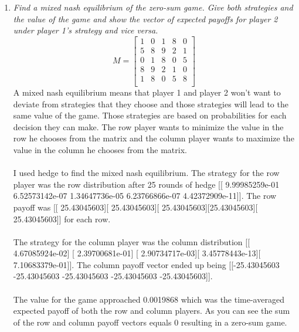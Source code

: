 \documentclass[12pt]{article}
\begin{document}
\begin{enumerate}
  \newpage
  \item \textit{Find a mixed nash equilibrium of the zero-sum game.  Give both
  strategies and the value of the game and show the vector of expected payoffs
  for player 2 under player 1's strategy and vice versa.}
    $$
    M = \begin{bmatrix}
        1 & 0 & 1 & 8 & 0\\
        5 & 8 & 9 & 2 & 1\\
        0 & 1 & 8 & 0 & 5\\
        8 & 9 & 2 & 1 & 0\\
        1 & 8 & 0 & 5 & 8\\
        \end{bmatrix}
    $$
  A mixed nash equilibrium means that player 1 and player 2 won't want to
  deviate from strategies that they choose and those strategies will lead to the same
  value of the game.  Those strategies are based on probabilities for each
  decision they can make. The row player wants to minimize the value in the
  row he chooses from the matrix and the column player wants to
  maximize the value in the column he chooses from the matrix.\\
  \\
  I used hedge to find the mixed nash equilibrium.  The strategy for the row
  player was the row distribution after 25 rounds of hedge [[  9.99985259e-01  
  6.52573142e-07 1.34647736e-05   6.23766866e-07 4.42372909e-11]].  The row
  payoff was [[ 25.43045603][ 25.43045603][ 25.43045603][25.43045603][ 25.43045603]] for each row.\\
  \\ 
  The strategy for the column player was the column distribution [[ 
  4.67085924e-02] [  2.39700681e-01] [  2.90734717e-03][  3.45778443e-13][  7.10683379e-01]].  
  The column payoff vector ended up being [[-25.43045603 -25.43045603
  -25.43045603 -25.43045603 -25.43045603]].\\
  \\
  The value for the game approached 0.0019868 which was the time-averaged
  expected payoff of both the row and column players.  As you can see the sum
  of the row and column payoff vectors equals 0 resulting in a zero-sum game.
  

\end{enumerate}
\end{document}
